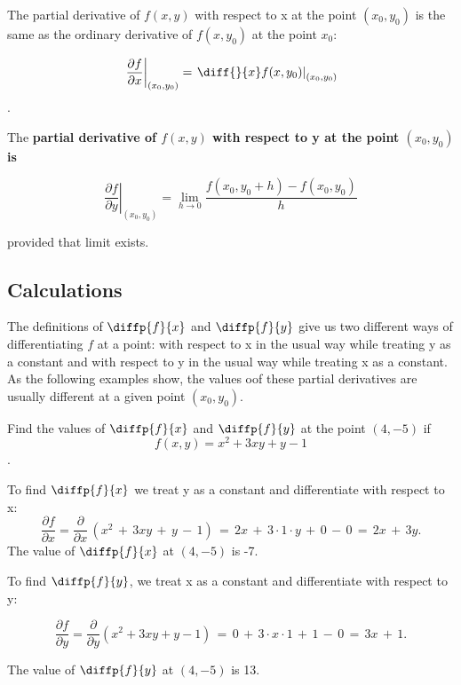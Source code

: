 \documentclass[12pt,a4paper]{article}
\newenvironment{definition}{\begin{definitionbox}}{\end{definitionbox}\vspace{1\baselineskip}}
\begin{document}
The partial derivative of \(f(x,y)\) with respect to x at the point \((x_0,y_0)\) is the same as the ordinary derivative of \(f(x,y_0)\) at the point \(x_0\):

\[\left. \frac{\partial f}{\partial x} \right|_{(x_0, y_0)} = \left. \diff{}{x}f(x,y_0)\right|_{(x_0, y_0)} \].


\begin{definition}
    The \textbf{partial derivative of \(f(x,y)\) with respect to y at the point \((x_0,y_0)\) is}

    \[\left. \frac{\partial f}{\partial y} \right|_{(x_0, y_0)} = \lim_{h \to 0}\frac{f(x_0,y_0+h)-f(x_0,y_0)}{h}\]

    provided that limit exists.


\end{definition}

\subsection{Calculations}

The definitions of \(\diffp{f}{x}\) and \(\diffp{f}{y}\) give us two different ways of differentiating \(f\) at a point: with respect to x in the usual way while treating y as a constant and with respect to y in the usual way while treating x as a constant. As the following examples show, the values oof these partial derivatives are usually different at a given point \((x_0,y_0)\).

\begin{example}
    Find the values of \(\diffp{f}{x}\) and \(\diffp{f}{y}\) at the point \((4,-5)\) if 
    \[f(x,y) = x^2 + 3xy + y -1\].

\end{example}

\begin{solution}
    To find \(\diffp{f}{x}\) we treat y as a constant and differentiate with respect to x:
    \[{\frac{\partial f}{\partial x}}={\frac{\partial}{\partial x}}\,(x^{2}\,+\,3x y\,+\,y\,-\,1)\,=\,2x\,+\,3\cdot1\cdot y\,+\,0\,-\,0\,=\,2x\,+\,3y.\]
    The value of \(\diffp{f}{x}\) at \((4,-5)\) is -7.

    To find  \(\diffp{f}{y}\), we treat x as a constant and differentiate with respect to y:

    \[{\frac{\partial f}{\partial y}}={\frac{\partial}{\partial y}}\left(x^{2}+3x y+y-1\right)\,=\,0\,+\,3\cdot x\cdot1\,+\,1\,-\,0\,=\,3x\,+\,1.\]

    The value of \(\diffp{f}{y}\) at \((4,-5)\) is 13.


\end{solution}
\end{document}
